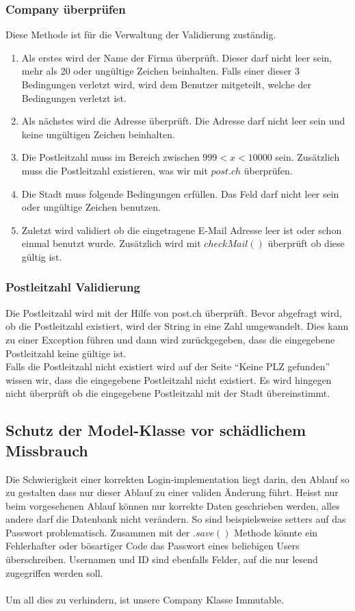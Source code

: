 \documentclass[10pt]{article}
\begin{document}
\subsubsection{Company überprüfen}
Diese Methode ist für die Verwaltung der Validierung zuständig. \begin{enumerate}
 \item Als erstes wird der Name der Firma überprüft. Dieser darf nicht leer sein, mehr als 20 oder ungültige Zeichen beinhalten. Falls einer dieser 3 Bedingungen verletzt wird, wird dem Benutzer mitgeteilt, welche der Bedingungen verletzt ist.
 \item Als nächstes wird die Adresse überprüft. Die Adresse darf nicht leer sein und keine ungültigen Zeichen beinhalten.
 \item Die Postleitzahl muss im Bereich zwischen $999 < x < 10000$ sein. Zusätzlich muss die Postleitzahl existieren, was wir mit $post.ch$ überprüfen.
 \item Die Stadt muss folgende Bedingungen erfüllen. Das Feld darf nicht leer sein oder ungültige Zeichen benutzen.
 \item Zuletzt wird validiert ob die eingetragene E-Mail Adresse leer ist oder schon einmal benutzt wurde. Zusätzlich wird mit $checkMail()$ überprüft ob diese gültig ist.
\end{enumerate}

\subsubsection{Postleitzahl Validierung}
Die Postleitzahl wird mit der Hilfe von post.ch überprüft. Bevor abgefragt wird, ob die Postleitzahl existiert, wird der String in eine Zahl umgewandelt. Dies kann zu einer Exception führen und dann wird zurückgegeben, dass die eingegebene Postleitzahl keine gültige ist.\\
Falls die Postleitzahl nicht existiert wird auf der Seite ``Keine PLZ gefunden'' wissen wir, dass die eingegebene Postleitzahl nicht existiert. Es wird hingegen nicht überprüft ob die eingegebene Postleitzahl mit der Stadt übereinstimmt.


\subsection{Schutz der Model-Klasse vor sch\"{a}dlichem Missbrauch}
Die Schwierigkeit einer korrekten Login-implementation liegt darin, den Ablauf so zu gestalten dass nur dieser Ablauf zu einer validen Änderung führt. Heisst nur beim vorgesehenen Ablauf können nur korrekte Daten geschrieben werden, alles andere darf die Datenbank nicht verändern. So sind beispielsweise setters auf das Passwort problematisch. Zusammen mit der $.save()$ Methode könnte ein Fehlerhafter oder bösartiger Code das Passwort eines beliebigen Users überschreiben. Usernamen und ID sind ebenfalls Felder, auf die nur lesend zugegriffen werden soll. \\
\\
Um all dies zu verhindern, ist unsere Company Klasse Immutable.
\end{document}
